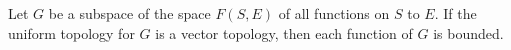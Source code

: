 Let $G$ be a subspace of the space $F(S, E)$ of all functions on $S$ to $E$. If the uniform topology for $G$ is a vector topology, then each function of $G$ is bounded.
